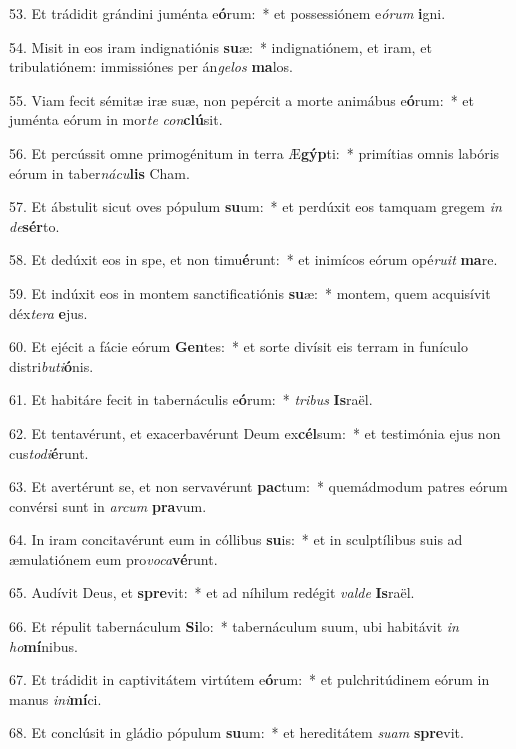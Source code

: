 53. Et trádidit grándini juménta e\textbf{ó}rum:~*  et possessiónem e\textit{ó}\textit{rum} \textbf{i}gni.\

54. Misit in eos iram indignatiónis \textbf{su}æ:~*  indignatiónem, et iram, et tribulatiónem: immissiónes per án\textit{ge}\textit{los} \textbf{ma}los.\

55. Viam fecit sémitæ iræ suæ, non pepércit a morte animábus e\textbf{ó}rum:~*  et juménta eórum in mor\textit{te} \textit{con}\textbf{clú}sit.\

56. Et percússit omne primogénitum in terra Æ\textbf{gýp}ti:~*  primítias omnis labóris eórum in taber\textit{ná}\textit{cu}\textbf{lis} Cham.\

57. Et ábstulit sicut oves pópulum \textbf{su}um:~*  et perdúxit eos tamquam gregem \textit{in} \textit{de}\textbf{sér}to.\

58. Et dedúxit eos in spe, et non timu\textbf{é}runt:~*  et inimícos eórum opé\textit{ru}\textit{it} \textbf{ma}re.\

59. Et indúxit eos in montem sanctificatiónis \textbf{su}æ:~*  montem, quem acquisívit déx\textit{te}\textit{ra} \textbf{e}jus.\

60. Et ejécit a fácie eórum \textbf{Gen}tes:~*  et sorte divísit eis terram in funículo distri\textit{bu}\textit{ti}\textbf{ó}nis.\

61. Et habitáre fecit in tabernáculis e\textbf{ó}rum:~*  \textit{tri}\textit{bus} \textbf{Is}raël.\

62. Et tentavérunt, et exacerbavérunt Deum ex\textbf{cél}sum:~*  et testimónia ejus non cus\textit{to}\textit{di}\textbf{é}runt.\

63. Et avertérunt se, et non servavérunt \textbf{pac}tum:~*  quemádmodum patres eórum convérsi sunt in \textit{ar}\textit{cum} \textbf{pra}vum.\

64. In iram concitavérunt eum in cóllibus \textbf{su}is:~*  et in sculptílibus suis ad æmulatiónem eum pro\textit{vo}\textit{ca}\textbf{vé}runt.\

65. Audívit Deus, et \textbf{spre}vit:~*  et ad níhilum redégit \textit{val}\textit{de} \textbf{Is}raël.\

66. Et répulit tabernáculum \textbf{Si}lo:~*  tabernáculum suum, ubi habitávit \textit{in} \textit{ho}\textbf{mí}nibus.\

67. Et trádidit in captivitátem virtútem e\textbf{ó}rum:~*  et pulchritúdinem eórum in manus \textit{in}\textit{i}\textbf{mí}ci.\

68. Et conclúsit in gládio pópulum \textbf{su}um:~*  et hereditátem \textit{su}\textit{am} \textbf{spre}vit.\

